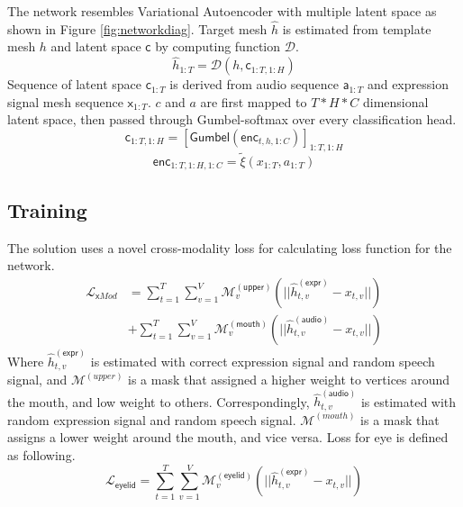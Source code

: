 \documentclass[10pt,twocolumn,letterpaper]{article}
\begin{document}
    The network resembles Variational Autoencoder with multiple latent space as shown in Figure \ref{fig:networkdiag}.
    Target mesh \(\hat{h}\) is estimated from template mesh \(h\) and latent space \(\mathsf{c}\) by computing function \(\mathcal{D}\).
    \begin{equation}
      \hat{h}_{1:T} = \mathcal{D}(h, \mathsf{c}_{1:T, 1:H})
      \label{eq:1}
    \end{equation}
    Sequence of latent space \(\mathsf{c}_{1:T}\) is derived from audio sequence \(\mathsf{a}_{1:T}\) and expression signal mesh sequence \(\mathsf{x}_{1:T}\).
    \(c\) and \(a\) are first mapped to \(T*H*C\) dimensional latent space, then passed through Gumbel-softmax\cite{jang2017categorical} over every classification head.
    \begin{equation}
      \mathsf{c}_{1:T, 1:H} = [\mathsf{Gumbel}(\mathsf{enc}_{t,h,1:C})]_{1:T, 1:H}
    \end{equation}
    \begin{equation}
      \mathsf{enc}_{1:T,1:H,1:C} = \tilde{\xi}(x_{1:T}, a_{1:T}) 
    \end{equation}
  
    \pagebreak  
    
    \subsection{Training}
      The solution uses a novel cross-modality loss for calculating loss function for the network.
      \begin{equation}
        \begin{split}
          \mathcal{L}_{\mathsf{x}Mod} &= 
            \sum_{t=1}^{T}
            \sum_{v=1}^{V}
            \mathcal{M}_v^{\mathsf{(upper)}}
            (||\hat{h}_{t,v}^{\mathsf{(expr)}} - x_{t,v}||)\\
            &+
            \sum_{t=1}^{T}
            \sum_{v=1}^{V}
            \mathcal{M}_v^{\mathsf{(mouth)}}
            (||\hat{h}_{t,v}^{\mathsf{(audio)}} - x_{t,v}||)  
        \end{split}
      \end{equation}
      Where \(\hat{h}_{t,v}^{\mathsf{(expr)}}\) is estimated with correct expression signal and random speech signal, and
      \(\mathcal{M}^{(upper)}\) is a mask that assigned a higher weight to vertices around the mouth, and low weight to others.
      Correspondingly, \(\hat{h}_{t,v}^{\mathsf{(audio)}}\) is estimated with random expression signal and random speech signal.
      \(\mathcal{M}^{(mouth)}\) is a mask that assigns a lower weight around the mouth, and vice versa.
      Loss for eye is defined as following.
      \begin{equation}
          \mathcal{L}_{\mathsf{eyelid}} = 
            \sum_{t=1}^{T}
            \sum_{v=1}^{V}
            \mathcal{M}_v^{\mathsf{(eyelid)}}
            (||\hat{h}_{t,v}^{\mathsf{(expr)}} - x_{t,v}||)
      \end{equation}
      
\end{document}
